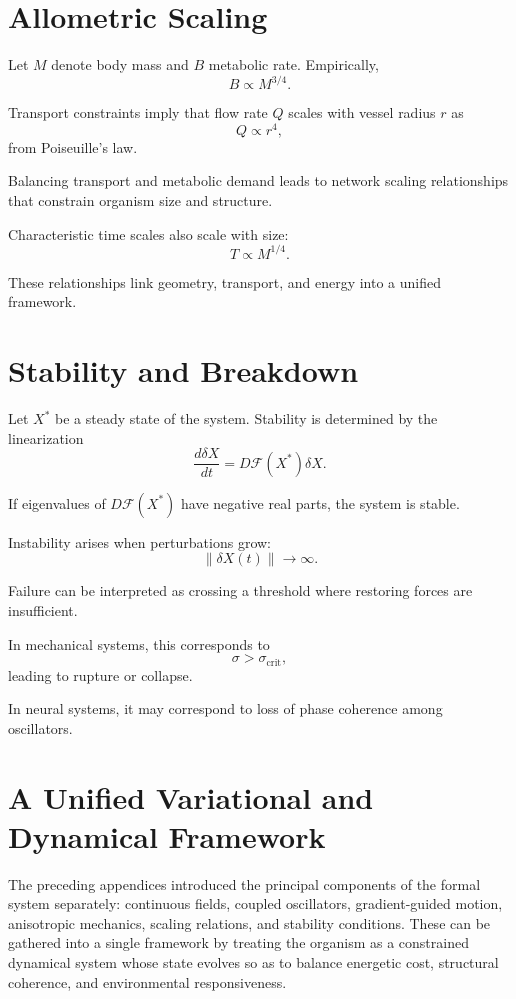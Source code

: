 \documentclass[11pt,oneside]{book}
\begin{document}
\section{Allometric Scaling}

Let $M$ denote body mass and $B$ metabolic rate. Empirically,
\[
B \propto M^{3/4}.
\]

Transport constraints imply that flow rate $Q$ scales with vessel radius $r$ as
\[
Q \propto r^4,
\]
from Poiseuille’s law.

Balancing transport and metabolic demand leads to network scaling relationships that constrain organism size and structure.

Characteristic time scales also scale with size:
\[
T \propto M^{1/4}.
\]

These relationships link geometry, transport, and energy into a unified framework.

\section{Stability and Breakdown}

Let $X^*$ be a steady state of the system. Stability is determined by the linearization
\[
\frac{d\delta X}{dt} = D\mathcal{F}(X^*) \delta X.
\]

If eigenvalues of $D\mathcal{F}(X^*)$ have negative real parts, the system is stable.

Instability arises when perturbations grow:
\[
\|\delta X(t)\| \to \infty.
\]

Failure can be interpreted as crossing a threshold where restoring forces are insufficient.

In mechanical systems, this corresponds to
\[
\sigma > \sigma_{\text{crit}},
\]
leading to rupture or collapse.

In neural systems, it may correspond to loss of phase coherence among oscillators.

\section{A Unified Variational and Dynamical Framework}

The preceding appendices introduced the principal components of the formal system separately: continuous fields, coupled oscillators, gradient-guided motion, anisotropic mechanics, scaling relations, and stability conditions. These can be gathered into a single framework by treating the organism as a constrained dynamical system whose state evolves so as to balance energetic cost, structural coherence, and environmental responsiveness.
\end{document}
